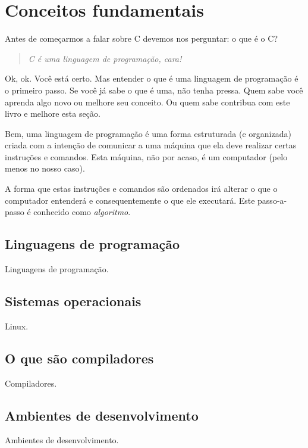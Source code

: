 

\chapter{Conceitos fundamentais}
Antes de começarmos a falar sobre C devemos nos perguntar: o que é o C?
\begin{quote}
\textit{C é uma linguagem de programação, cara!}
\end{quote}

Ok, ok. Você está certo. Mas entender o que é uma linguagem de programação é o primeiro passo. Se você já sabe o que é uma, não tenha pressa. Quem sabe você aprenda algo novo ou melhore seu conceito. Ou quem sabe contribua com este livro e melhore esta seção.

Bem, uma linguagem de programação é uma forma estruturada (e organizada) criada com a intenção de comunicar a uma máquina que ela deve realizar certas instruções e comandos. Esta máquina, não por acaso, é um computador (pelo menos no nosso caso).

A forma que estas instruções e comandos são ordenados irá alterar o que o computador entenderá e consequentemente o que ele executará. Este passo-a-passo é conhecido como \textit{algoritmo}.



\section{Linguagens de programação}

Linguagens de programação.


\section{Sistemas operacionais}

Linux.


\section{O que são compiladores}

Compiladores.


\section{Ambientes de desenvolvimento}

Ambientes de desenvolvimento.


